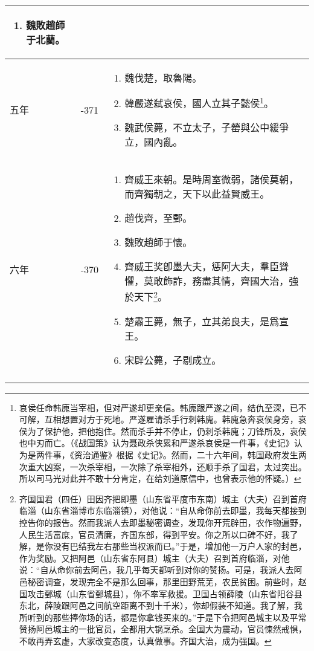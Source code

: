 \begin{longtable}{|>{\centering\scriptsize}m{2em}|>{\centering\scriptsize}m{1.3em}|>{\centering}m{8.8em}|}
\begin{enumerate}
  \item 魏敗趙師于北藺。
  \end{enumerate} \tabularnewline\hline
  五年 & -371 & \begin{enumerate}
    \tiny
  \item 魏伐楚，取魯陽。
  \item 韓嚴遂弑哀侯，國人立其子懿侯\footnote{哀侯任命韩廆当宰相，但对严遂却更亲信。韩廆跟严遂之间，结仇至深，已不可解，互相想置对方于死地。严遂雇请杀手行刺韩廆。韩廆急奔哀侯身旁，哀侯为了保护他，把他抱住。然而杀手并不停止，仍刺杀韩廆；刀锋所及，哀侯也中刃而亡。（《战国策》认为聂政杀侠累和严遂杀哀侯是一件事，《史记》认为是两件事，《资治通鉴》根据《史记》。然而，二十六年间，韩国政府发生两次重大凶案，一次杀宰相，一次除了杀宰相外，还顺手杀了国君，太过突出。所以司马光对此并不敢十分肯定，在给刘道原信中，也曾表示他的怀疑。）}。
  \item 魏武侯薨，不立太子，子罃與公中緩爭立，國內亂。
  \end{enumerate} \tabularnewline\hline
  六年 & -370 & \begin{enumerate}
    \tiny
  \item 齊威王來朝。是時周室微弱，諸侯莫朝，而齊獨朝之，天下以此益賢威王。
  \item 趙伐齊，至鄄。
  \item 魏敗趙師于懷。
  \item 齊威王奖卽墨大夫，惩阿大夫，羣臣聳懼，莫敢飾詐，務盡其情，齊國大治，強於天下\footnote{齐国国君（四任）田因齐把即墨（山东省平度市东南）城主（大夫）召到首府临淄（山东省淄博市东临淄镇），对他说：“自从命你前去即墨，我每天都接到控告你的报告。然而我派人去即墨秘密调查，发现你开荒辟田，农作物遍野，人民生活富庶，官员清廉，齐国东部，得到平安。你之所以口碑不好，我了解，是你没有巴结我左右那些当权派而已。”于是，增加他一万户人家的封邑，作为奖励。又把阿邑（山东省东阿县）城主（大夫）召到首府临淄，对他说：“自从命你前去阿邑，我几乎每天都听到对你的赞扬。可是，我派人去阿邑秘密调查，发现完全不是那么回事，那里田野荒芜，农民贫困。前些时，赵国攻击鄄城（山东省鄄城县），你不率军救援。卫国占领薛陵（山东省阳谷县东北，薛陵跟阿邑之间航空距离不到十千米），你却假装不知道。我了解，我所听到的那些捧你场的话，都是你拿钱买来的。”于是下令把阿邑城主以及平常赞扬阿邑城主的一批官员，全都用大锅烹杀。全国大为震动，官员悚然戒惧，不敢再弄玄虚，大家改变态度，认真做事。齐国大治，成为强国。}。
  \item 楚肅王薨，無子，立其弟良夫，是爲宣王。
  \item 宋辟公薨，子剔成立。
  \end{enumerate} \tabularnewline\hline \newpage

\end{longtable}
